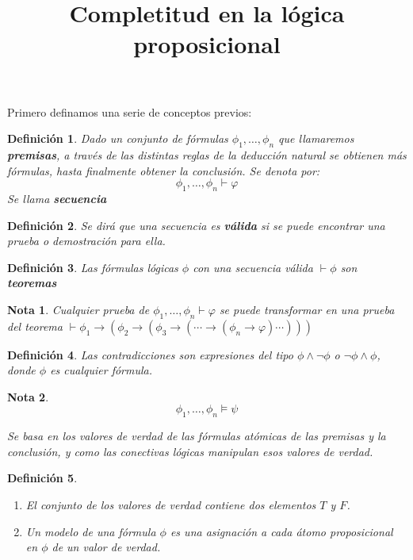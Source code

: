 \documentclass[18pt]{article}
\newtheorem{Def}{Definición}
\newtheorem{nota}{Nota}
\begin{document}
\title{Completitud en la lógica proposicional}
\maketitle 
\large
Primero definamos una serie de conceptos previos:

\begin{Def}
  Dado un conjunto de fórmulas $\phi_1,\dots, \phi_n$ que llamaremos \textbf{premisas}, a través de las distintas reglas de la deducción natural se obtienen más fórmulas, hasta finalmente obtener la conclusión. Se denota por:
  $$\phi_1,\dots, \phi_n \vdash \varphi $$
Se llama \textbf{secuencia}
\end{Def}

\begin{Def}
  Se dirá que una secuencia es \textbf{válida} si se puede encontrar una prueba o demostración para ella.
\end{Def}

\begin{Def}
Las fórmulas lógicas $\phi$ con una secuencia válida $\vdash \phi$ son \textbf{teoremas}
\end{Def}

\begin{nota}
Cualquier prueba de $\phi_1,\dots, \phi_n \vdash \varphi $ se puede transformar en una prueba del teorema $\vdash \phi_1 \rightarrow (\phi_2 \rightarrow ( \phi_3 \rightarrow (\cdots \rightarrow (\phi_n\rightarrow \varphi )\cdots )))$
\end{nota}

\begin{Def}
  Las contradicciones son expresiones del tipo $\phi \wedge \neg \phi$ o $\neg \phi \wedge \phi$, donde $\phi$ es cualquier fórmula. 
\end{Def}

\begin{nota}
  $$\phi_1,\dots, \phi_n \models \psi $$

  Se basa en los valores de verdad de las fórmulas atómicas de las premisas y la conclusión, y como las conectivas lógicas manipulan esos valores de verdad. 
\end{nota}

\begin{Def}
  \begin{enumerate}
  \item El conjunto de los valores de verdad contiene dos elementos $T$ y $F$.
  \item Un modelo de una fórmula $\phi$ es una asignación a cada átomo proposicional en $\phi$ de un valor de verdad. 
  \end{enumerate}
\end{Def}
\end{document}
